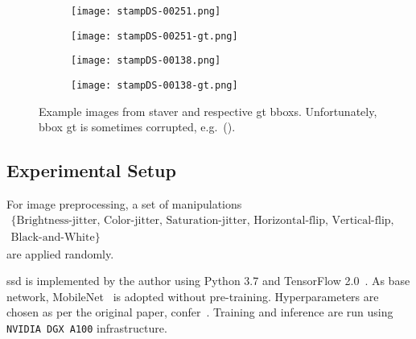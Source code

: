 \begin{figure}[th!]
    \begin{subfigure}[t]{.225\linewidth}
        \centering
        \texttt{[image: stampDS-00251.png]}
        \label{fig:text-stamp}
    \end{subfigure}\hfill
    \begin{subfigure}[t]{.225\linewidth}
        \centering
        \texttt{[image: stampDS-00251-gt.png]}
        \label{fig:text-stamp-gt}
    \end{subfigure}\hfill
    \begin{subfigure}[t]{.225\linewidth}
        \centering
        \texttt{[image: stampDS-00138.png]}
        \label{fig:img-stamp}
    \end{subfigure}\hfill
    \begin{subfigure}[t]{.225\linewidth}
        \centering
        \texttt{[image: stampDS-00138-gt.png]}
        \label{fig:img-stamp-gt}
    \end{subfigure}
    \caption[Example images from \gls{staver} and respective \gls{gt}]{Example
    images from \gls{staver} and respective \gls{gt} \glspl{bbox}. Unfortunately,
    \gls{bbox} \gls{gt} is sometimes corrupted, e.g.\ ().}
\end{figure}

\subsection{Experimental Setup}\label{sect:exp-setup}
For image preprocessing, a set of manipulations
\begin{multline*}
    \{\text{Brightness-jitter, Color-jitter, Saturation-jitter, Horizontal-flip, Vertical-flip, Random-crop,}\\\text{Black-and-White}\}
\end{multline*}
are applied randomly.

\Gls{ssd} is implemented by the author using Python 3.7 and TensorFlow 2.0~\cite{Abadi.2015}.
As base network, MobileNet~\cite[cf.][]{Howard.2017} is adopted without pre-training\footnotemark.
Hyperparameters are chosen as per the original paper, confer~\cite{Liu.2016}.
Training and inference are run using \texttt{NVIDIA DGX A100} infrastructure.

